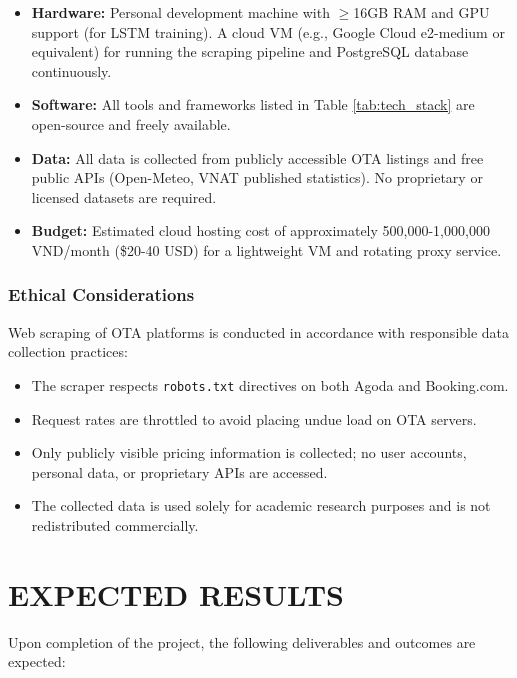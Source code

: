 \documentclass[12pt,a4paper]{report}
\begin{document}
\begin{itemize}
    \item \textbf{Hardware:} Personal development machine with $\geq$16GB RAM and GPU support (for LSTM training). A cloud VM (e.g., Google Cloud e2-medium or equivalent) for running the scraping pipeline and PostgreSQL database continuously.
    \item \textbf{Software:} All tools and frameworks listed in Table \ref{tab:tech_stack} are open-source and freely available.
    \item \textbf{Data:} All data is collected from publicly accessible OTA listings and free public APIs (Open-Meteo, VNAT published statistics). No proprietary or licensed datasets are required.
    \item \textbf{Budget:} Estimated cloud hosting cost of approximately 500,000-1,000,000 VND/month (\$20-40 USD) for a lightweight VM and rotating proxy service.
\end{itemize}

\subsection{Ethical Considerations}

Web scraping of OTA platforms is conducted in accordance with responsible data collection practices:

\begin{itemize}
    \item The scraper respects \texttt{robots.txt} directives on both Agoda and Booking.com.
    \item Request rates are throttled to avoid placing undue load on OTA servers.
    \item Only publicly visible pricing information is collected; no user accounts, personal data, or proprietary APIs are accessed.
    \item The collected data is used solely for academic research purposes and is not redistributed commercially.
\end{itemize}

\chapter{EXPECTED RESULTS}

Upon completion of the project, the following deliverables and outcomes are expected:
\end{document}
